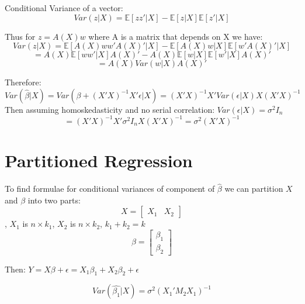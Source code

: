 \documentclass[DIV=14,titlepage=false]{scrreprt}
\begin{document}
\begin{corollary} 
Conditional Variance of a vector:
\[Var(z|X)=\mathbb{E}[zz'|X]-\mathbb{E}[z|X]\mathbb{E}[z'|X]\]
\end{corollary}

Thus for \(z = A(X)w\) where A is a matrix that depends on X we have:
\[Var(z|X)= \mathbb{{E}}[A(X)w w' A(X)'|X]-\mathbb{{E}}[A(X)w|X]\mathbb{{E}}[w' A(X)'|X]\]
\[=A(X)\mathbb{E}[ww'|X]A(X)'-A(X)\mathbb{E}[w|X]\mathbb{E}[w'|X]A(X)'\]
\[=A(X)Var(w|X)A(X)'\]

Therefore:
\[Var(\hat{\beta}|X)=Var(\beta + (X'X)^{-1}X'\epsilon|X)=(X'X)^{-1}X'Var(\epsilon|X)X(X'X)^{-1}\]
Then assuming homoskedasticity and no serial correlation: \(Var(\epsilon|X)=\sigma^2I_n\)
\[=(X'X)^{-1}X'\sigma^2I_nX(X'X)^{-1}=\sigma^2(X'X)^{-1}\]


\section{Partitioned Regression}

To find formulae for conditional variances of component of \(\hat{\beta}\) we can partition \(X\) and \(\beta\) into two parts:
\[X=\begin{bmatrix}X_1 & X_2\end{bmatrix}\], \(X_1\) is \(n\times k_1\), \(X_2\) is \(n\times k_2\), \(k_1+k_2=k\)
\[\beta=\begin{bmatrix}\beta_1 \\ \beta_2\end{bmatrix}\]

Then: \(Y=X\beta+\epsilon=X_1\beta_1+X_2\beta_2+\epsilon\)

\vspace{5mm}

\begin{theorem}
  \[Var(\hat{\beta_1}|X)=\sigma^2(X_1'M_2X_1)^{-1}\]  
\end{theorem}

\vspace{5mm}
\end{document}
